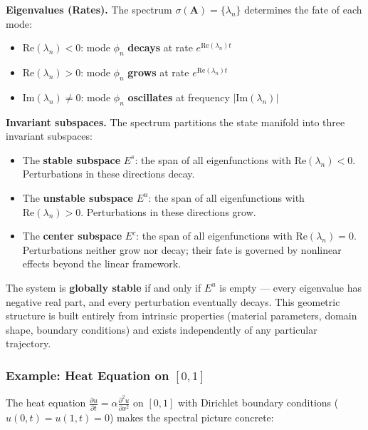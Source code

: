 \documentclass[
  letterpaper,
  DIV=11,
  numbers=noendperiod]{scrartcl}
\providecommand{\tightlist}{%
  \setlength{\itemsep}{0pt}\setlength{\parskip}{0pt}}
\begin{document}
\textbf{Eigenvalues (Rates).} The spectrum
\(\sigma(\mathbf{A}) = \{\lambda_n\}\) determines the fate of each mode:

\begin{itemize}
\tightlist
\item
  \(\text{Re}(\lambda_n) < 0\): mode \(\phi_n\) \textbf{decays} at rate
  \(e^{\text{Re}(\lambda_n) t}\)
\item
  \(\text{Re}(\lambda_n) > 0\): mode \(\phi_n\) \textbf{grows} at rate
  \(e^{\text{Re}(\lambda_n) t}\)
\item
  \(\text{Im}(\lambda_n) \neq 0\): mode \(\phi_n\) \textbf{oscillates}
  at frequency \(|\text{Im}(\lambda_n)|\)
\end{itemize}

\textbf{Invariant subspaces.} The spectrum partitions the state manifold
into three invariant subspaces:

\begin{itemize}
\tightlist
\item
  The \textbf{stable subspace} \(E^s\): the span of all eigenfunctions
  with \(\text{Re}(\lambda_n) < 0\). Perturbations in these directions
  decay.
\item
  The \textbf{unstable subspace} \(E^u\): the span of all eigenfunctions
  with \(\text{Re}(\lambda_n) > 0\). Perturbations in these directions
  grow.
\item
  The \textbf{center subspace} \(E^c\): the span of all eigenfunctions
  with \(\text{Re}(\lambda_n) = 0\). Perturbations neither grow nor
  decay; their fate is governed by nonlinear effects beyond the linear
  framework.
\end{itemize}

The system is \textbf{globally stable} if and only if \(E^u\) is empty
--- every eigenvalue has negative real part, and every perturbation
eventually decays. This geometric structure is built entirely from
intrinsic properties (material parameters, domain shape, boundary
conditions) and exists independently of any particular trajectory.

\subsubsection{\texorpdfstring{Example: Heat Equation on
\([0,1]\)}{Example: Heat Equation on {[}0,1{]}}}\label{example-heat-equation-on-01}

The heat equation
\(\frac{\partial u}{\partial t} = \alpha \frac{\partial^2 u}{\partial x^2}\)
on \([0,1]\) with Dirichlet boundary conditions
(\(u(0,t) = u(1,t) = 0\)) makes the spectral picture concrete:
\end{document}
